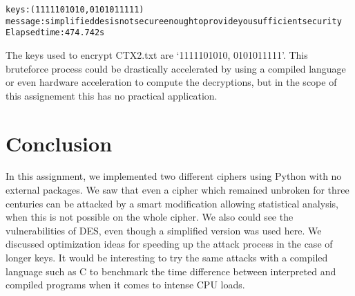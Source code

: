 \documentclass{article}
\begin{document}
\begin{alltt}
    keys : (1111101010, 0101011111) 
    message : simplifieddesisnotsecureenoughtoprovideyousufficientsecurity
    Elapsed time : 474.742s    
\end{alltt}

The keys used to encrypt CTX2.txt are `1111101010, 0101011111'. This bruteforce process could be drastically accelerated by using a compiled language or even hardware acceleration to compute the decryptions, but in the scope of this assignement this has no practical application.

\section{Conclusion}

In this assignment, we implemented two different ciphers using Python with no external packages. We saw that even a cipher which remained unbroken for three centuries can be attacked by a smart modification allowing statistical analysis, when this is not possible on the whole cipher. We also could see the vulnerabilities of DES, even though a simplified version was used here. We discussed optimization ideas for speeding up the attack process in the case of longer keys. 
It would be interesting to try the same attacks with a compiled language such as C to benchmark the time difference between interpreted and compiled programs when it comes to intense CPU loads.





\end{document}
